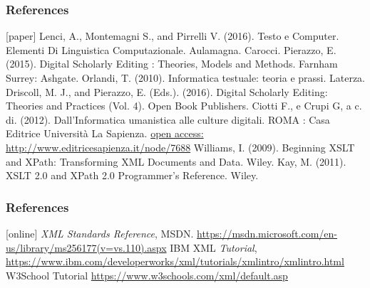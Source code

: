 
\begin{frame}
    \frametitle{References}
    \addtocounter{nframe}{1}
    \begin{thebibliography}{10}
        [paper]
        \tiny{} Lenci, A., Montemagni S., and Pirrelli V. (2016). Testo e Computer. Elementi Di Linguistica Computazionale. Aulamagna. Carocci.
        \tiny{} Pierazzo, E. (2015). Digital Scholarly Editing : Theories, Models and Methods. Farnham Surrey: Ashgate.
        \tiny{} Orlandi, T. (2010). Informatica testuale: teoria e prassi. Laterza.
        \tiny{} Driscoll, M. J., and Pierazzo, E. (Eds.). (2016). Digital Scholarly Editing: Theories and Practices (Vol. 4). Open Book Publishers.
        \tiny{} Ciotti F., e Crupi G, a c. di. (2012). Dall’Informatica umanistica alle culture digitali. ROMA : Casa Editrice Università La Sapienza. \href{http://www.editricesapienza.it/node/7688}{open access: http://www.editricesapienza.it/node/7688}
        \tiny{} Williams, I. (2009). Beginning XSLT and XPath: Transforming XML Documents and Data. Wiley.
        \tiny{} Kay, M. (2011). XSLT 2.0 and XPath 2.0 Programmer’s Reference. Wiley.
    \end{thebibliography}

\end{frame}

\begin{frame}
    \frametitle{References}
    \addtocounter{nframe}{1}
    \begin{thebibliography}{10}
        
        [online]
        \tiny{} \textit{XML Standards Reference}, MSDN. \url{https://msdn.microsoft.com/en-us/library/ms256177(v=vs.110).aspx}
        \tiny{} IBM XML \textit{Tutorial}, \url{https://www.ibm.com/developerworks/xml/tutorials/xmlintro/xmlintro.html}
        \tiny{} W3School Tutorial \url{https://www.w3schools.com/xml/default.asp}

    \end{thebibliography}

\end{frame}